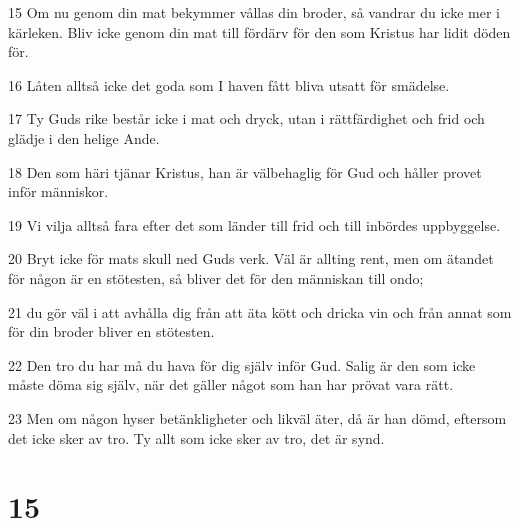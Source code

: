 \par 15 Om nu genom din mat bekymmer vållas din broder, så vandrar du icke mer i kärleken. Bliv icke genom din mat till fördärv för den som Kristus har lidit döden för.
\par 16 Låten alltså icke det goda som I haven fått bliva utsatt för smädelse.
\par 17 Ty Guds rike består icke i mat och dryck, utan i rättfärdighet och frid och glädje i den helige Ande.
\par 18 Den som häri tjänar Kristus, han är välbehaglig för Gud och håller provet inför människor.
\par 19 Vi vilja alltså fara efter det som länder till frid och till inbördes uppbyggelse.
\par 20 Bryt icke för mats skull ned Guds verk. Väl är allting rent, men om ätandet för någon är en stötesten, så bliver det för den människan till ondo;
\par 21 du gör väl i att avhålla dig från att äta kött och dricka vin och från annat som för din broder bliver en stötesten.
\par 22 Den tro du har må du hava för dig själv inför Gud. Salig är den som icke måste döma sig själv, när det gäller något som han har prövat vara rätt.
\par 23 Men om någon hyser betänkligheter och likväl äter, då är han dömd, eftersom det icke sker av tro. Ty allt som icke sker av tro, det är synd.

\chapter{15}

